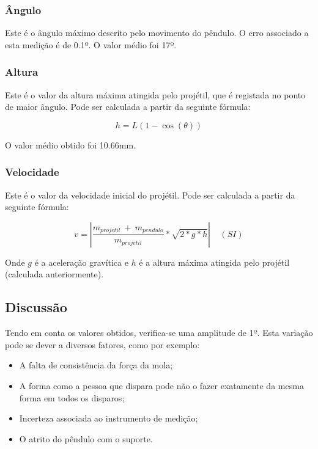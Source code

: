 {\subsubsection{Ângulo}
\label{subsec:analise-discussao-parte3-angulo}

Este é o ângulo máximo descrito pelo movimento do pêndulo. O erro associado a esta medição é de 0.1º. O valor médio foi 17º.

\subsubsection{Altura}
\label{subsec:analise-discussao-parte3-altura}

Este é o valor da altura máxima atingida pelo projétil, que é registada no ponto de maior ângulo. Pode ser calculada a partir da seguinte fórmula:

\begin{equation}
    h = L(1 - \cos(\theta))
\end{equation}

O valor médio obtido foi 10.66mm.

\subsubsection{Velocidade}
\label{subsec:analise-discussao-parte3-velocidade}

Este é o valor da velocidade inicial do projétil. Pode ser calculada a partir da seguinte fórmula:

\begin{equation}
    v = \left| \frac{m_{projetil}~+~m_{pendulo}}{m_{projetil}} * \sqrt{2*g*h} \right|~~~~~(SI)
    \label{eq:parte3-velocidade-inicial}
\end{equation}

Onde $g$ é a aceleração gravítica e $h$ é a altura máxima atingida pelo projétil (calculada anteriormente).

\subsection{Discussão}
\label{subsec:analise-discussao-parte3-discussao}

Tendo em conta os valores obtidos, verifica-se uma amplitude de 1º. Esta variação pode se dever a diversos fatores, como por exemplo:

\begin{itemize}
    \item A falta de consistência da força da mola;
    \item A forma como a pessoa que dispara pode não o fazer exatamente da mesma forma em todos os disparos;
    \item Incerteza associada ao instrumento de medição;
    \item O atrito do pêndulo com o suporte.
\end{itemize}

}
